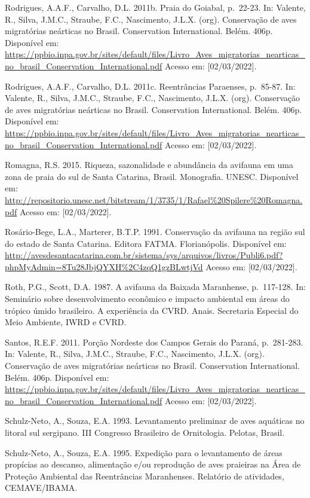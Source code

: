\documentclass[
  oneside]{scrbook}
\begin{document}
Rodrigues, A.A.F., Carvalho, D.L. 2011b. Praia do Goiabal, p.~22-23. In: Valente, R., Silva, J.M.C., Straube, F.C., Nascimento, J.L.X. (org). Conservação de aves migratórias neárticas no Brasil. Conservation International. Belém. 406p. Disponível em: \url{https://ppbio.inpa.gov.br/sites/default/files/Livro_Aves_migratorias_nearticas_no_brasil_Conservation_International.pdf} Acesso em: {[}02/03/2022{]}.

Rodrigues, A.A.F., Carvalho, D.L. 2011c. Reentrâncias Paraenses, p.~85-87. In: Valente, R., Silva, J.M.C., Straube, F.C., Nascimento, J.L.X. (org). Conservação de aves migratórias neárticas no Brasil. Conservation International. Belém. 406p. Disponível em: \url{https://ppbio.inpa.gov.br/sites/default/files/Livro_Aves_migratorias_nearticas_no_brasil_Conservation_International.pdf} Acesso em: {[}02/03/2022{]}.

Romagna, R.S. 2015. Riqueza, sazonalidade e abundância da avifauna em uma zona de praia do sul de Santa Catarina, Brasil. Monografia. UNESC. Disponível em: \url{http://repositorio.unesc.net/bitstream/1/3735/1/Rafael\%20Spilere\%20Romagna.pdf} Acesso em: {[}02/03/2022{]}.

Rosário-Bege, L.A., Marterer, B.T.P. 1991. Conservação da avifauna na região sul do estado de Santa Catarina. Editora FATMA. Florianópolis. Disponível em: \url{http://avesdesantacatarina.com.br/sistema/sys/arquivos/livros/Publi6.pdf?phpMyAdmin=8Tu28JbjQYXH\%2C4zqQ1gzBLwtjVd} Acesso em: {[}02/03/2022{]}.

Roth, P.G., Scott, D.A. 1987. A avifauna da Baixada Maranhense, p.~117-128. In: Seminário sobre desenvolvimento econômico e impacto ambiental em áreas do trópico úmido brasileiro. A experiência da CVRD. Anais. Secretaria Especial do Meio Ambiente, IWRD e CVRD.

Santos, R.E.F. 2011. Porção Nordeste dos Campos Gerais do Paraná, p.~281-283. In: Valente, R., Silva, J.M.C., Straube, F.C., Nascimento, J.L.X. (org). Conservação de aves migratórias neárticas no Brasil. Conservation International. Belém. 406p. Disponível em: \url{https://ppbio.inpa.gov.br/sites/default/files/Livro_Aves_migratorias_nearticas_no_brasil_Conservation_International.pdf} Acesso em: {[}02/03/2022{]}.

Schulz-Neto, A., Souza, E.A. 1993. Levantamento preliminar de aves aquáticas no litoral sul sergipano. III Congresso Brasileiro de Ornitologia. Pelotas, Brasil.

Schulz-Neto, A., Souza, E.A. 1995. Expedição para o levantamento de áreas propícias ao descanso, alimentação e/ou reprodução de aves praieiras na Área de Proteção Ambiental das Reentrâncias Maranhenses. Relatório de atividades, CEMAVE/IBAMA.
\end{document}
